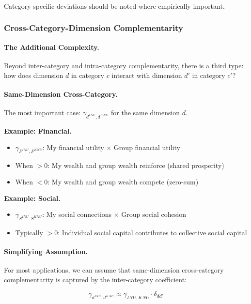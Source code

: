 Category-specific deviations should be noted where empirically important.

\subsubsection{Cross-Category-Dimension Complementarity}
\label{sec:cross-category-dimension}

\paragraph{The Additional Complexity.}
Beyond inter-category and intra-category complementarity, there is a third 
type: how does dimension $d$ in category $c$ interact with dimension $d'$ 
in category $c'$?

\paragraph{Same-Dimension Cross-Category.}
The most important case: $\gamma_{d^{INU}, d^{KNU}}$ for the same dimension $d$.

\textbf{Example: Financial.}
\begin{itemize}
    \item $\gamma_{F^{INU}, F^{KNU}}$: My financial utility $\times$ Group financial utility
    \item When $> 0$: My wealth and group wealth reinforce (shared prosperity)
    \item When $< 0$: My wealth and group wealth compete (zero-sum)
\end{itemize}

\textbf{Example: Social.}
\begin{itemize}
    \item $\gamma_{S^{INU}, S^{KNU}}$: My social connections $\times$ Group social cohesion
    \item Typically $> 0$: Individual social capital contributes to collective social capital
\end{itemize}

\paragraph{Simplifying Assumption.}
For most applications, we can assume that same-dimension cross-category 
complementarity is captured by the inter-category coefficient:

\begin{equation}
\gamma_{d^{INU}, d^{KNU}} \approx \gamma_{INU,KNU} \cdot \delta_{dd'}
\end{equation}

